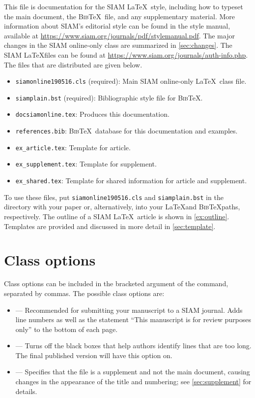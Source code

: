 \documentclass[final,onefignum,onetabnum]{siamonline190516}
\newcommand{\BibTeX}{{\scshape Bib}\TeX\xspace}
\newcounter{example}
\begin{document}
This file is documentation for the SIAM \LaTeX\ style, including how
to typeset the main document, the \BibTeX\ file, and any supplementary
material. More information
about SIAM's editorial style can be found in the style manual, available
at \url{https://www.siam.org/journals/pdf/stylemanual.pdf}.
%
The major changes in the SIAM online-only class are summarized in \cref{sec:changes}.
%
The SIAM \LaTeX\@ files can be found at
\url{https://www.siam.org/journals/auth-info.php}. The files that
are distributed are given below. 
\begin{itemize}
\item \texttt{siamonline190516.cls} (required): Main SIAM online-only \LaTeX\ class file.
\item \texttt{siamplain.bst} (required): Bibliographic style file for
  \BibTeX.
\item \texttt{docsiamonline.tex}: Produces this documentation.
\item \texttt{references.bib}: \BibTeX\ database for this
  documentation and examples.
\item \texttt{ex\_article.tex}: Template for article.
\item \texttt{ex\_supplement.tex}: Template for supplement.
\item \texttt{ex\_shared.tex}: Template for shared information for
  article and supplement.
\end{itemize}
To use these files, put \texttt{siamonline190516.cls} and
\texttt{siamplain.bst} in the directory with your
paper or, alternatively, into your \LaTeX\@ and \BibTeX\@ paths,
respectively. 
%
The outline of a SIAM \LaTeX\ article is shown in
\cref{ex:outline}. Templates are provided and discussed in more detail
in \cref{sec:template}.

\section{Class options}
\label{sec:class-options}

Class options can be included in the bracketed argument of the
command, separated by commas. The possible class options are:
\begin{itemize}
\item {} --- Recommended for submitting your manuscript to
  a SIAM journal.  Adds line numbers as well as the statement ``This
  manuscript is for review purposes only'' to the bottom of each page.
\item {} --- Turns off the black boxes that help authors
  identify lines that are too long. The final published version will
  have this option on.
\item {} --- Specifies that the file is a supplement
  and not the main document, causing changes in the appearance of the
  title and numbering; see \cref{sec:supplement} for details.
\end{itemize}
\end{document}
